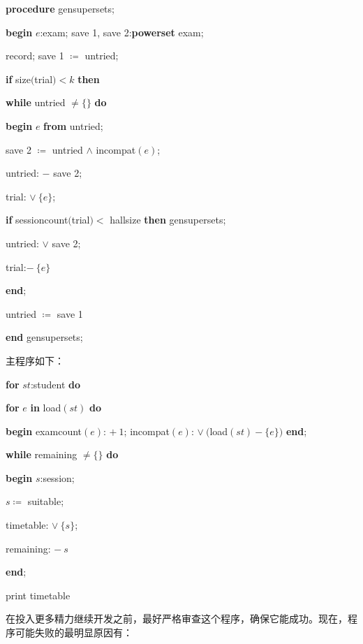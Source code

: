 \quad \textbf{procedure} gensupersets;

\quad \quad \textbf{begin} $e$:exam; save 1, save 2:\textbf{powerset} exam;

\quad \quad \quad record; save 1 $\coloneq$ untried;

\quad \quad \quad \textbf{if} size$($trial$) < k$ \textbf{then}

\quad \quad \quad \quad \textbf{while} untried $\neq \{\}$ \textbf{do}

\quad \quad \quad \quad \quad \textbf{begin} $e$ \textbf{from} untried;

\quad \quad \quad \quad \quad \quad save 2 $\coloneq$ untried $\wedge$ incompat$(e)$;

\quad \quad \quad \quad \quad \quad untried: $-$ save 2;

\quad \quad \quad \quad \quad \quad trial: $\vee\ \{e\}$;

\quad \quad \quad \quad \quad \quad \textbf{if} sessioncount$($trial$) <$ hallsize \textbf{then} gensupersets;

\quad \quad \quad \quad \quad \quad untried: $\vee$ save 2;

\quad \quad \quad \quad \quad \quad trial:$-\ \{e\}$

\quad \quad \quad \quad \quad \textbf{end};

\quad \quad \quad \quad untried $\coloneq$ save 1

\quad \textbf{end} gensupersets;

\noindent
主程序如下：

\quad \textbf{for} $st$:student \textbf{do}

\quad \quad \textbf{for} $e$ \textbf{in} load$(st)$ \textbf{do}

\quad \quad \quad \textbf{begin} examcount$(e)$: $+\ 1$; incompat$(e)$: $\vee\ ($load$(st) - \{e\})$ \textbf{end};

\quad \textbf{while} remaining $\neq \{\}$ \textbf{do}

\quad \quad \quad \textbf{begin} $s$:session;

\quad \quad \quad \quad $s\coloneq$ suitable;

\quad \quad \quad \quad timetable: $\vee\ \{s\}$;

\quad \quad \quad \quad remaining: $-\ s$

\quad \quad \quad \textbf{end};

\quad print timetable

在投入更多精力继续开发之前，最好严格审查这个程序，确保它能成功。现在，程序可能失败的最明显原因有：

